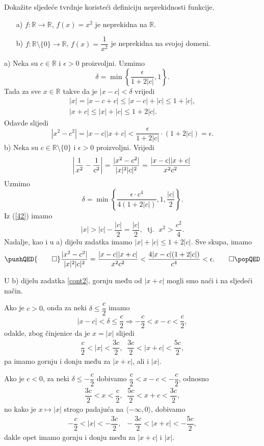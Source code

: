 \begin{exercise}
\label{cont2}
Dokažite sljedeće tvrdnje koristeći definiciju neprekidnosti funkcije.
\begin{itemize}
\item[a)] $f : \mathbb{R}\to \mathbb{R}$, $f(x)=x^2$ je neprekidna na $\mathbb{R}$.
\item[b)] $f : \mathbb{R}\setminus\{0\}\to \mathbb{R}$, $f(x)=\dfrac{1}{x^2}$ je neprekidna na svojoj domeni.
\end{itemize}
\end{exercise}
\begin{proof*}
a) Neka su $c\in \mathbb{R}$ i $\epsilon>0$ proizvoljni. Uzmimo $$\delta=\min\left\{\dfrac{\epsilon}{1+2|c|}, 1\right\}.$$ 
Tada za sve $x\in \mathbb{R}$ takve da je $|x-c|<\delta$ vrijedi 
\begin{gather*}
|x|=|x-c+c|\leq |x-c|+|c|\leq 1+|c|,\\
|x+c|\leq |x|+|c|\leq 1+2|c|.
\end{gather*}
Odavde slijedi
$$|x^2-c^2|=|x-c||x+c|<\dfrac{\epsilon}{1+2|c|}\cdot(1+2|c|)=\epsilon.$$
b) Neka su $c\in \mathbb{R}\setminus\{0\}$ i $\epsilon>0$ proizvoljni. Vrijedi
$$\abs{\dfrac{1}{x^2}-\dfrac{1}{c^2}}=\dfrac{|x^2-c^2|}{|x|^2|c|^2}=\dfrac{|x-c||x+c|}{x^2c^2}$$
Uzmimo
$$\delta=\min\left\{\dfrac{\epsilon\cdot c^4}{4\left(1+2|c|\right)}, 1, \dfrac{|c|}{2}\right\}.$$
Iz (\ref{42}) imamo $$|x|>|c|-\dfrac{|c|}{2}=\dfrac{|c|}{2},\; \text{ tj. }\; x^2>\dfrac{c^2}{4}.$$
Nadalje, kao i u a) dijelu zadatka imamo $|x|+|c|\leq 1+2|c|$. Sve skupa, imamo
\[
\pushQED{\qed}
\dfrac{|x^2-c^2|}{|x|^2|c|^2}=\dfrac{|x-c||x+c|}{x^2c^2}<\dfrac{4|x-c|(1+2|c|)}{c^4}<\epsilon.\qedhere
\popQED
\]
\end{proof*}
\begin{remark}
U b) dijelu zadatka \ref{cont2}, gornju među od $|x+c|$ mogli smo naći i na sljedeći način.

Ako je $c>0$, onda za neki $\delta\leq \dfrac{c}{2}$ imamo
$$|x-c|< \delta\leq \dfrac{c}{2} \Longrightarrow -\dfrac{c}{2}<x-c<\dfrac{c}{2},$$
odakle, zbog činjenice da je $x=|x|$ slijedi
\begin{gather}
\label{44}
\dfrac{c}{2}<|x|<\dfrac{3c}{2},\;\; \dfrac{3c}{2}<|x+c|<\dfrac{5c}{2},
\end{gather}
pa imamo gornju i donju među za $|x+c|$, ali i $|x|$.

Ako je $c<0$, za neki $\delta\leq -\dfrac{c}{2}$  dobivamo $\dfrac{c}{2}<x-c<-\dfrac{c}{2}$, odnosno 
\begin{gather*}
\dfrac{3c}{2}<x<\dfrac{c}{2},\;\; \dfrac{5c}{2}<x+c<\dfrac{3c}{2},
\end{gather*}
no kako je $x\mapsto |x|$ strogo padajuća na $\langle -\infty, 0\rangle$, dobivamo
\begin{gather*}
-\dfrac{c}{2}<|x|<-\dfrac{3c}{2},\;\; -\dfrac{3c}{2}<|x+c|<-\dfrac{5c}{2},
\end{gather*}
dakle opet imamo gornju i donju među za $|x+c|$ i $|x|$.
\end{remark}
